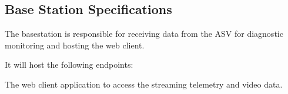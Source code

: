 %
%
%
%

\subsection{Base Station Specifications}
\label{sec:basestation-specifications}
The basestation is responsible for receiving data from the ASV for diagnostic monitoring and hosting the web client.

It will host the following endpoints:

\begin{description}
    \label{itm:endpoints}
    \item[\textit{/client}] The web client application to access the streaming telemetry and video data.
\end{description}

